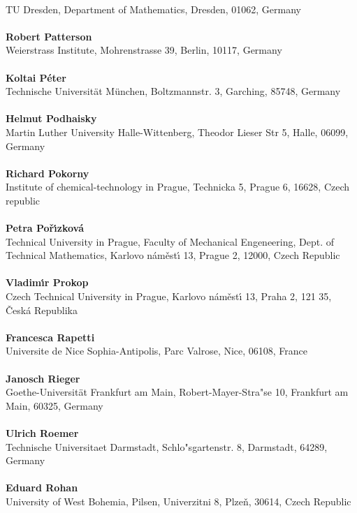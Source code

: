 \\ 
TU Dresden, Department of Mathematics, Dresden, 01062, Germany\\ 
\\ 
\textbf{Robert Patterson}
\\ 
Weierstrass Institute, Mohrenstrasse 39, Berlin, 10117, Germany\\ 
\\ 
\textbf{Koltai P\'eter}
\\ 
Technische Universit\"at M\"unchen, Boltzmannstr. 3, Garching, 85748, Germany\\ 
\\ 
\textbf{Helmut Podhaisky}
\\ 
Martin Luther University Halle-Wittenberg, Theodor Lieser Str 5, Halle, 06099, Germany\\ 
\\ 
\textbf{Richard Pokorny}
\\ 
Institute of chemical-technology in Prague, Technicka 5, Prague 6, 16628, Czech republic\\ 
\\ 
\textbf{Petra Po\v{r}\'{\i}zkov\'a}
\\ 
Technical University in Prague, Faculty of Mechanical Engeneering, Dept. of Technical Mathematics, Karlovo n\'am\v{e}st\'{\i} 13, Prague 2, 12000, Czech Republic\\ 
\\ 
\textbf{Vladim\'{\i}r Prokop}
\\ 
Czech Technical University in Prague, Karlovo n\'am\v{e}st\'{\i} 13, Praha 2, 121 35, \v{C}esk\'a Republika\\ 
\\ 
\textbf{Francesca Rapetti}
\\ 
Universite de Nice Sophia-Antipolis, Parc Valrose, Nice, 06108, France\\ 
\\ 
\textbf{Janosch Rieger}
\\ 
Goethe-Universit\"at Frankfurt am Main, Robert-Mayer-Stra"se 10, Frankfurt am Main, 60325, Germany\\ 
\\ 
\textbf{Ulrich Roemer}
\\ 
Technische Universitaet Darmstadt, Schlo"sgartenstr. 8, Darmstadt, 64289, Germany\\ 
\\ 
\textbf{Eduard Rohan}
\\ 
University of West Bohemia, Pilsen, Univerzitni 8, Plze\v{n}, 30614, Czech Republic\\ 
